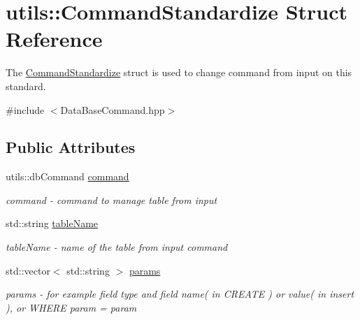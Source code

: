 \hypertarget{structutils_1_1_command_standardize}{}\section{utils\+::Command\+Standardize Struct Reference}
\label{structutils_1_1_command_standardize}


The \mbox{\hyperlink{structutils_1_1_command_standardize}{Command\+Standardize}} struct is used to change command from input on this standard.  




{\ttfamily \#include $<$Data\+Base\+Command.\+hpp$>$}

\subsection*{Public Attributes}
\begin{DoxyCompactItemize}
\item 
\mbox{\label{structutils_1_1_command_standardize_ad1b2f84d044e78fb682d427c050826be}} 
utils\+::db\+Command \mbox{\hyperlink{structutils_1_1_command_standardize_ad1b2f84d044e78fb682d427c050826be}{command}}
\begin{DoxyCompactList}\small\item\em command -\/ command to manage table from input \end{DoxyCompactList}\item 
\mbox{\label{structutils_1_1_command_standardize_a53778311e7c0704468cbe39d9cdd00d4}} 
std\+::string \mbox{\hyperlink{structutils_1_1_command_standardize_a53778311e7c0704468cbe39d9cdd00d4}{table\+Name}}
\begin{DoxyCompactList}\small\item\em table\+Name -\/ name of the table from input command \end{DoxyCompactList}\item 
std\+::vector$<$ std\+::string $>$ \mbox{\hyperlink{structutils_1_1_command_standardize_aac262dd521b08147d130def175b65c8d}{params}}
\begin{DoxyCompactList}\small\item\em params -\/ for example field type and field name( in C\+R\+E\+A\+T\+E ) or value( in insert ), or W\+H\+E\+RE param = param \end{DoxyCompactList}\end{DoxyCompactItemize}



